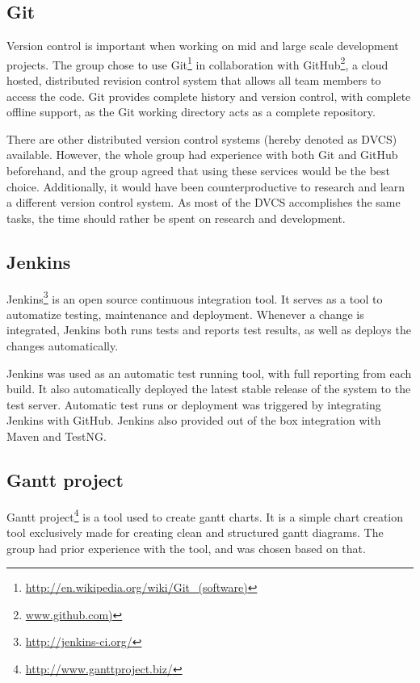 \subsection{Git}
\label{subsec:prestudies-tools-git}

Version control is important when working on mid and large scale development projects. The group chose to use Git\footnote{\url{http://en.wikipedia.org/wiki/Git_(software)}} in collaboration with GitHub\footnote{\url{www.github.com)}}, a cloud hosted, distributed revision control system that allows all team members to access the code. Git provides complete history and version control, with complete offline support, as the Git working directory acts as a complete repository.

There are other distributed version control systems (hereby denoted as DVCS) available. However, the whole group had experience with both Git and GitHub beforehand, and the group agreed that using these services would be the best choice. Additionally, it would have been counterproductive to research and learn a different version control system. As most of the DVCS accomplishes the same tasks, the time should rather be spent on research and development.

\subsection{Jenkins}
\label{subsec:prestudies-tools-jenkins}

Jenkins\footnote{\url{http://jenkins-ci.org/}} is an open source continuous integration tool. It serves as a tool to automatize testing, maintenance and deployment. Whenever a change is integrated, Jenkins both runs tests and reports test results, as well as deploys the changes automatically.

Jenkins was used as an automatic test running tool, with full reporting from each build. It also automatically deployed the latest stable release of the system to the test server. Automatic test runs or deployment was triggered by integrating Jenkins with GitHub. Jenkins also provided out of the box integration with Maven and TestNG.

\subsection{Gantt project}
\label{subsec:prestudies-tools-gantt_project}

Gantt project\footnote{\url{http://www.ganttproject.biz/}} is a tool used to create gantt charts. It is a simple chart creation tool exclusively made for creating clean and structured gantt diagrams. The group had prior experience with the tool, and was chosen based on that.

